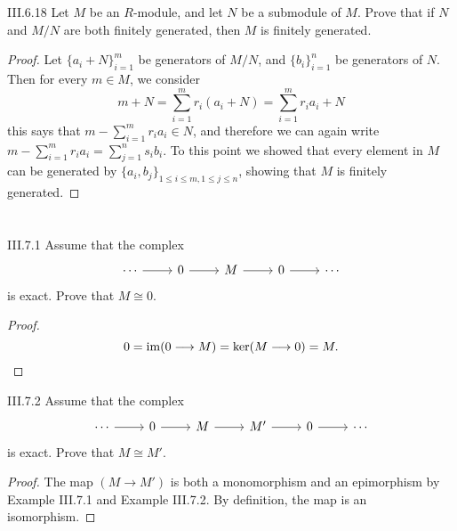 \begin{problem}{III.6.18}
Let $M$ be an $R$-module, and let $N$ be a submodule of $M$. Prove that if $N$ and $M/N$ are both finitely generated, then $M$ is finitely generated.
\end{problem}
\begin{proof}
Let $\{a_i + N\}_{i = 1}^m$ be generators of $M/N$, and $\{b_i\}_{i = 1}^n$ be generators of $N$. Then for every $m \in M$, we consider
\[
m + N = \sum_{i=1}^m r_i (a_i + N) = \sum_{i=1}^m r_i a_i + N
\]
this says that $m - \sum_{i=1}^m r_i a_i \in N$, and therefore we can again write $m - \sum_{i=1}^m r_i a_i = \sum_{j=1}^n s_i b_i$. To this point we showed that every element in $M$ can be generated by $\{a_i,b_j\}_{1 \leq i \leq m, 1 \leq j \leq n}$, showing that $M$ is finitely generated.
\end{proof}

\section{}

\begin{problem}{III.7.1}
Assume that the complex
\[
\begin{tikzcd}
\cdots \arrow[r] &0 \arrow[r] &M \arrow[r] &0 \arrow[r] &\cdots
\end{tikzcd}
\]
is exact. Prove that $M \cong 0$.
\end{problem}
\begin{proof}
\[
0 = \operatorname{im} (0 \longrightarrow M) = \ker (M \longrightarrow 0) = M.
\]
\end{proof}

\begin{problem}{III.7.2}
Assume that the complex
\[
\begin{tikzcd}
\cdots \arrow[r] &0 \arrow[r] &M \arrow[r] &M' \arrow[r] &0 \arrow[r] &\cdots
\end{tikzcd}
\]
is exact. Prove that $M \cong M'$.
\end{problem}
\begin{proof}
The map $(M \longrightarrow M')$ is both a monomorphism and an epimorphism by Example III.7.1 and Example III.7.2. By definition, the map is an isomorphism.
\end{proof}

